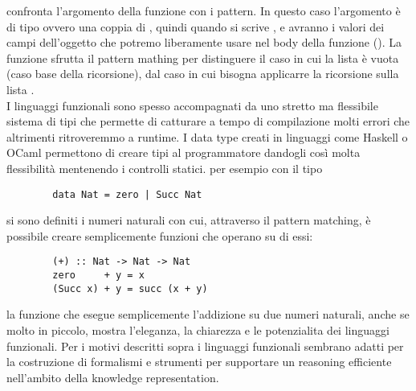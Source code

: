      confronta l'argomento della funzione con i pattern. In questo caso l'argomento è di tipo  ovvero
    una coppia di , quindi quando si scrive ,  e  avranno i valori dei campi dell'oggetto 
    che potremo liberamente usare nel body della funzione ().
    La funzione  sfrutta il pattern mathing per distinguere il caso in cui la lista è vuota  (caso base della ricorsione), dal caso in cui
    bisogna applicarre la ricorsione sulla lista . 
    \\I linguaggi funzionali sono spesso accompagnati da uno stretto ma flessibile sistema di tipi
    che permette di catturare a tempo di compilazione molti errori che altrimenti ritroveremmo a runtime. I data type creati in linguaggi come Haskell o OCaml
    permettono di creare tipi al programmatore dandogli così molta flessibilità mentenendo i controlli statici. per esempio con il tipo 
    \begin{verbatim}
        data Nat = zero | Succ Nat
    \end{verbatim}
    si sono definiti i numeri naturali con cui, attraverso il pattern matching, è possibile creare semplicemente funzioni che operano su di essi:
    \begin{verbatim}
        (+) :: Nat -> Nat -> Nat
        zero     + y = x
        (Succ x) + y = succ (x + y) 
    \end{verbatim}
    la funzione \code{(+)} che esegue semplicemente l'addizione su due numeri naturali, anche se molto in piccolo, mostra l'eleganza, la chiarezza e le potenzialita dei linguaggi funzionali.
    Per i motivi descritti sopra i linguaggi funzionali sembrano adatti per la costruzione di formalismi e strumenti per supportare un reasoning efficiente
    nell'ambito della knowledge representation.
